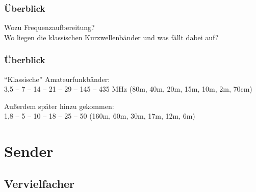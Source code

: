 \begin{frame}
    \frametitle{Überblick}

    Wozu Frequenzaufbereitung?\\[2em]
    Wo liegen die klassischen Kurzwellenbänder und
    was fällt dabei auf?

\end{frame}

\begin{frame}
    \frametitle{Überblick}

    ``Klassische'' Amateurfunkbänder: \\[2em]

    3,5 -- 7 -- 14 -- 21 -- 29 -- 145 -- 435 MHz (80m, 40m, 20m, 15m, 10m, 2m, 70cm)

    \vspace{3em}

    Außerdem später hinzu gekommen: \\[2em]

    1,8 -- 5 -- 10 -- 18 -- 25 -- 50 (160m, 60m, 30m, 17m, 12m, 6m)


\end{frame}

\section{Sender}

\subsection{Vervielfacher}

